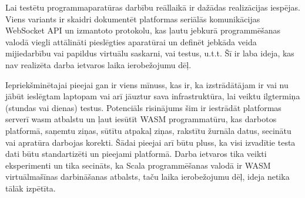 Lai testētu programmaparatūras darbību reāllaikā ir dažādas realizācijas
iespējas. Viens variants ir skaidri dokumentēt platformas seriālās komunikācijas
WebSocket API un izmantoto protokolu, kas ļautu jebkurā programmēšanas valodā
viegli attālināti pieslēgties aparatūrai un definēt jebkāda veida mijiedarbību
vai papildus virtuālu saskarni, vai testus, u.t.t. Šī ir laba ideja, kas nav
realizēta darba ietvaros laika ierobežojumu dēļ.

Iepriekšminētajai pieejai gan ir viens mīnuss, kas ir, ka izstrādātājam ir vai
nu jābūt ieslēgtam laptopam vai arī jāuztur sava infrastruktūra, lai veiktu
ilgtermiņa (stundas vai dienas) testus. Potenciāls risinājums šim ir iestrādāt
platformas serverī \gls{wasm} atbalstu un ļaut iesūtīt WASM programmatūru, kas
darbotos platformā, saņemtu ziņas, sūtītu atpakaļ ziņas, rakstītu žurnāla datus,
secinātu vai apratūra darbojas korekti. Šādai pieejai arī būtu pluss, ka visi
izvadītie testa dati būtu standartizēti un pieejami platformā. Darba ietvaros
tika veikti eksperimenti un tika secināts, ka Scala programmēšanas valodā ir
WASM virtuālmašīnas darbināšanas atbalsts, taču laika ierobežojumu dēļ, ideja
netika tālāk izpētīta.
